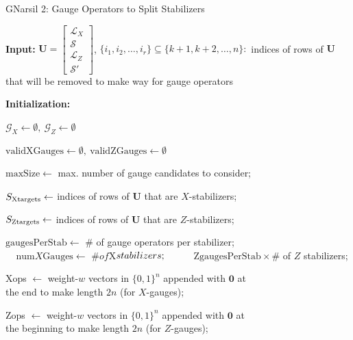 \documentclass[conference]{IEEEtran}
\begin{document}
\begin{algorithm}[!htp]
\caption{GNarsil 2: Gauge Operators to Split Stabilizers}
\label{alg:euclid2}

\begin{algorithmic}[2]


\State \textbf{Input:} $\boldsymbol{U} = 
\begin{bmatrix}
    \mathcal{L}_{X} \\
    \mathcal{S} \\
    \mathcal{L}_{Z}\\
    \mathcal{S'}
\end{bmatrix}$, $\{ i_1, i_2, \ldots, i_r \} \subseteq \{ k+1, k+2, \ldots, n \}:$ indices of rows of $\boldsymbol{U}$ that will be removed to make way for gauge operators

\State \textbf{Initialization:} 



$\mathcal{G}_X \gets \emptyset, \ \mathcal{G}_Z \gets \emptyset$

$\mathrm{validXGauges} \gets \emptyset, \ \mathrm{validZGauges} \gets \emptyset$



$\mathrm{maxSize} \gets $ max. number of gauge candidates to consider; 

$S_{\rm Xtargets} \gets$ indices of rows of $\boldsymbol{U}$ that are $X$-stabilizers; 

$S_{\rm Ztargets} \gets$ indices of rows of $\boldsymbol{U}$ that are $Z$-stabilizers; 

$\mathrm{gaugesPerStab} \gets $ \# of gauge operators per stabilizer; 
\\
 $ \  \ \  \ \  \mathrm{num}X\mathrm{Gauges}\gets $ \times$\# of $X$ stabilizers; 
 \\
 $ \  \ \  \ \  Z\gets $ \mathrm{gaugesPerStab}\times$\# of $Z$ stabilizers; 

Xops $\gets$ weight-$w$ vectors in $\{0,1\}^{n}$ appended with $\boldsymbol{0}$ at\\ \hspace{1.75cm} the end to make length $2n$ (for $X$-gauges); 

Zops $\gets$ weight-$w$ vectors in $\{0,1\}^{n}$ appended with $\boldsymbol{0}$ at\\ \hspace{1.75cm} the beginning to make length $2n$ (for $Z$-gauges); 


\end{algorithmic}
\end{algorithm}
\end{document}
